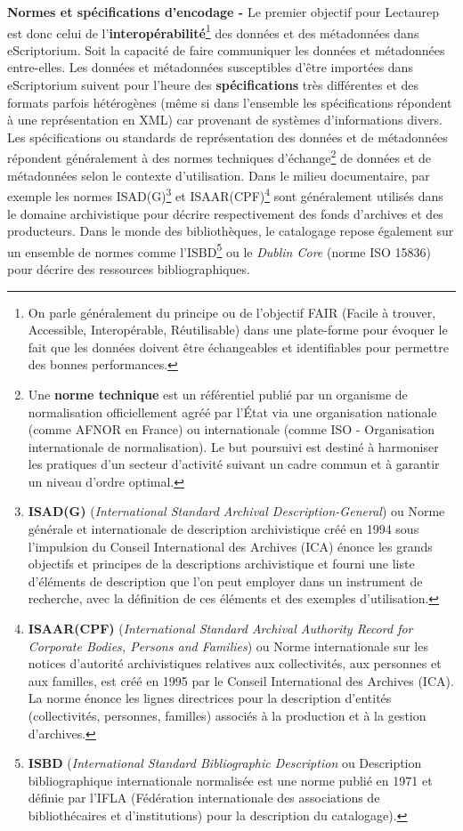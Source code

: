 \textbf{Normes et spécifications d'encodage -}
Le premier objectif pour Lectaurep est donc celui de l'\textbf{interopérabilité}\footnote{On parle généralement du principe ou de l'objectif FAIR (Facile à trouver, Accessible, Interopérable, Réutilisable) dans une plate-forme pour évoquer le fait que les données doivent être échangeables et identifiables pour permettre des bonnes performances.} des données et des métadonnées dans eScriptorium. Soit la capacité de faire communiquer les données et métadonnées entre-elles. Les données et métadonnées susceptibles d'être importées dans eScriptorium suivent pour l'heure des \textbf{spécifications} très différentes et des formats parfois hétérogènes (même si dans l'ensemble les spécifications répondent à une représentation en XML) car provenant de systèmes d'informations divers. Les spécifications ou standards de représentation des données et de métadonnées répondent généralement à des normes techniques d'échange\footnote{Une \textbf{norme technique} est un référentiel publié par un organisme de normalisation officiellement agréé par l'État via une organisation nationale (comme AFNOR en France) ou internationale (comme ISO - Organisation internationale de normalisation). Le but poursuivi est destiné à harmoniser les pratiques d'un secteur d'activité suivant un cadre commun et à garantir un niveau d'ordre optimal.} de données et de métadonnées selon le contexte d'utilisation. Dans le milieu documentaire, par exemple les normes ISAD(G)\footnote{\textbf{ISAD(G)} (\textit{International Standard Archival Description-General}) ou Norme générale et internationale de description archivistique créé en 1994 sous l'impulsion du Conseil International des Archives (ICA) énonce les grands objectifs et principes de la descriptions archivistique et fourni une liste d'éléments de description que l'on peut employer dans un instrument de recherche, avec la définition de ces éléments et des exemples d'utilisation.} et ISAAR(CPF)\footnote{\textbf{ISAAR(CPF)} (\textit{International Standard Archival Authority Record for Corporate Bodies, Persons and Families}) ou Norme internationale sur les notices d'autorité archivistiques relatives aux collectivités, aux personnes et aux familles, est créé en 1995 par le Conseil International des Archives (ICA). La norme énonce les lignes directrices pour la description d'entités (collectivités, personnes, familles) associés à la production et à la gestion d'archives.} sont généralement utilisés dans le domaine archivistique pour décrire respectivement des fonds d'archives et des producteurs. Dans le monde des bibliothèques, le catalogage repose également sur un ensemble de normes comme l'ISBD\footnote{\textbf{ISBD} (\textit{International Standard Bibliographic Description} ou Description bibliographique internationale normalisée est une norme publié en 1971 et définie par l'IFLA (Fédération internationale des associations de bibliothécaires et d'institutions) pour la description du catalogage).} ou le \textit{Dublin Core} (norme ISO 15836) pour décrire des ressources bibliographiques. 
